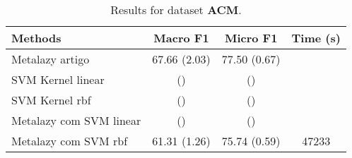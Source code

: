 \documentclass{article}
\begin{document}
			
	\begin{table}[t]
		\small
		\centering	
		\begin{tabular}{l c c c}	
			\toprule
			\textbf{Methods} & \textbf{Macro F1} & \textbf{Micro F1} & \textbf{Time (s)} \\
			\midrule    
			Metalazy artigo &  67.66 (2.03) &  77.50 (0.67) & \\
			SVM Kernel linear &  () &  () & \\
			SVM Kernel rbf &   () &  () & \\
			Metalazy com SVM linear &  ()  &  () &  \\	
			Metalazy com SVM rbf & 61.31 (1.26)  & 75.74 (0.59) & 47233\\	
			\bottomrule 
		\end{tabular}
		\caption{Results for dataset \textbf{ACM}.}
		\label{tab:dataset_ACM}
	\end{table}
	




\begin{comment}
\begin{table}[t]
	\small
	\centering	
	\begin{tabular}{c c c}	
		\toprule
		\textbf{Methods} & & \textbf{STANFORD\_TWEETS}\\
		\midrule    
		\multirow{2}{*}{METALAZY}& macro F1  \\ &micro F1 \\	
		\bottomrule 
	\end{tabular}
	\caption{The cardinality of $P$ and $F$ for different cities.}
	\label{tab:dataset}
\end{table}
\end{comment}



\begin{comment}
\begin{table}[t]
	\small
	\centering	
	\begin{tabular}{l c c}	
		\toprule
		\textbf{} & pred:Positive & pred:Negative \\
		\midrule    
		Positive & 29 & 6\\
		Negative & 4 & 32 \\
		\bottomrule 
	\end{tabular}
	\caption{Confusion matrix svm kernel rbf.}
	\label{tab:dataset_Stanford}
\end{table}
\end{comment}

%
%
\end{document}
